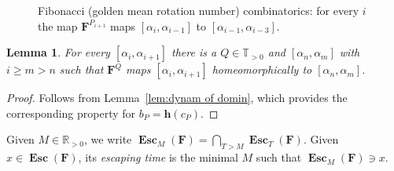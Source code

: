 \documentclass{amsart}
\newcommand{\1}{{\mathbb 1 }}
\newcommand\PT{\mathbb{ T}}
\newcommand{\bF}{{\mathbf F}}
\newcommand{\bbh}{{\mathbf h}}
\newcommand{\R}{\mathbb{R}}
\newtheorem{lem}[thm]{Lemma}
\theoremstyle{remark}
\numberwithin{equation}{section}
\theoremstyle{definition}
\newcommand{\Esc}{{\boldsymbol{\operatorname{Esc}}}}
\theoremstyle{nonumberbreak}
\begin{document}
\begin{figure}
\caption{Fibonacci (golden mean rotation number) combinatorics: for every $i$ the map $\bF^{P_{i+1}}$ maps $[\alpha_{i},\alpha_{i-1}]$ to  $[\alpha_{i-1},\alpha_{i-3}]$.}
\label{fig:FibonComb}
\end{figure}

\begin{lem}
\label{lem:dynam of domin:alpha}
For every $[\alpha_i,\alpha_{i+1}]$ there is a $Q\in \PT_{>0}$ and $[\alpha_n,\alpha_m]$ with $i\ge m>n$ such that $\bF^Q$ maps $[\alpha_i,\alpha_{i+1}]$ homeomorphically to $[\alpha_n,\alpha_m]$.
\end{lem}
\begin{proof}
Follows from Lemma~\ref{lem:dynam of domin}, which provides the corresponding property for $b_P=\bbh(c_P)$.
\end{proof}

Given $M\in \R_{>0}$, we write $\Esc_M(\bF)=\displaystyle\bigcap_{T>M}\Esc_T(\bF)$. Given $x\in \Esc(\bF)$, its \emph{escaping time} is the minimal $M$ such that $\Esc_M(\bF)\ni x$.
\end{document}
